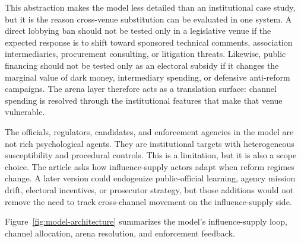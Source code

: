 This abstraction makes the model less detailed than an institutional case study, but it is the reason cross-venue substitution can be evaluated in one system. A direct lobbying ban should not be tested only in a legislative venue if the expected response is to shift toward sponsored technical comments, association intermediaries, procurement consulting, or litigation threats. Likewise, public financing should not be tested only as an electoral subsidy if it changes the marginal value of dark money, intermediary spending, or defensive anti-reform campaigns. The arena layer therefore acts as a translation surface: channel spending is resolved through the institutional features that make that venue vulnerable.

The officials, regulators, candidates, and enforcement agencies in the model are not rich psychological agents. They are institutional targets with heterogeneous susceptibility and procedural controls. This is a limitation, but it is also a scope choice. The article asks how influence-supply actors adapt when reform regimes change. A later version could endogenize public-official learning, agency mission drift, electoral incentives, or prosecutor strategy, but those additions would not remove the need to track cross-channel movement on the influence-supply side.

Figure~\ref{fig:model-architecture} summarizes the model's influence-supply loop, channel allocation, arena resolution, and enforcement feedback.



